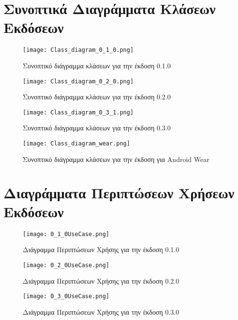 \section{Συνοπτικά Διαγράμματα Κλάσεων Εκδόσεων}
	\label{ap:version_class_diag}
	\begin{figure}[h]
	\centering
		\texttt{[image: Class\_diagram\_0\_1\_0.png]}
	\caption{Συνοπτικό διάγραμμα κλάσεων για την έκδοση 0.1.0}
	\end{figure}

	\begin{figure}[p]
	\centering
		\texttt{[image: Class\_diagram\_0\_2\_0.png]}
	\caption{Συνοπτικό διάγραμμα κλάσεων για την έκδοση 0.2.0}
	\end{figure}

	\begin{figure}[p]
	\centering
		\texttt{[image: Class\_diagram\_0\_3\_1.png]}
	\caption{Συνοπτικό διάγραμμα κλάσεων για την έκδοση 0.3.0}
	\end{figure}

	\begin{figure}[p]
	\centering
		\texttt{[image: Class\_diagram\_wear.png]}
	\caption{Συνοπτικό διάγραμμα κλάσεων για την έκδοση για Android Wear}
	\end{figure}
\newpage
\section{Διαγράμματα Περιπτώσεων Χρήσεων Εκδόσεων}
	\label{ap:version_usecase_diag}
	\begin{figure}[h]
	\centering
		\texttt{[image: 0\_1\_0UseCase.png]}
	\caption{Διάγραμμα Περιπτώσεων Χρήσης για την έκδοση 0.1.0}
	\end{figure}

	\begin{figure}[p]
	\centering
		\texttt{[image: 0\_2\_0UseCase.png]}
	\caption{Διάγραμμα Περιπτώσεων Χρήσης για την έκδοση 0.2.0}
	\end{figure}

	\begin{figure}[p]
	\centering
		\texttt{[image: 0\_3\_0UseCase.png]}
	\caption{Διάγραμμα Περιπτώσεων Χρήσης για την έκδοση 0.3.0}
	\end{figure}